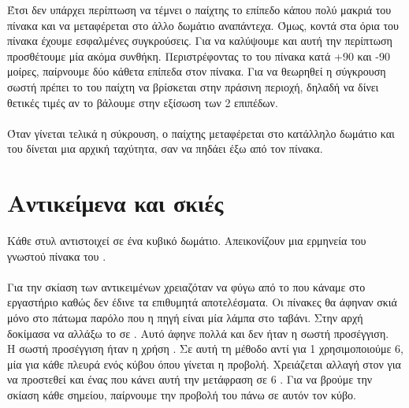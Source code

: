 \documentclass[11pt]{scrartcl} %
\begin{document}
Έτσι δεν υπάρχει περίπτωση να τέμνει ο παίχτης το επίπεδο κάπου πολύ μακριά του πίνακα και να μεταφέρεται στο άλλο δωμάτιο αναπάντεχα.
Όμως, κοντά στα όρια του πίνακα έχουμε εσφαλμένες συγκρούσεις. Για να καλύψουμε και αυτή την περίπτωση προσθέτουμε μία ακόμα συνθήκη.
Περιστρέφοντας το  του πίνακα κατά +90 και -90 μοίρες, παίρνουμε δύο κάθετα επίπεδα στον πίνακα. Για να θεωρηθεί η σύγκρουση
σωστή πρέπει το  του παίχτη να βρίσκεται στην πράσινη περιοχή, δηλαδή να δίνει θετικές τιμές αν το βάλουμε στην εξίσωση
των 2 επιπέδων.
\\\\
Όταν γίνεται τελικά η σύκρουση, ο παίχτης μεταφέρεται στο κατάλληλο δωμάτιο και του δίνεται μια αρχική ταχύτητα,
σαν να πηδάει έξω από τον πίνακα.
\clearpage

\section{Αντικείμενα και σκιές}
Κάθε στυλ  αντιστοιχεί σε ένα κυβικό δωμάτιο. Απεικονίζουν μια  ερμηνεία του γνωστού πίνακα του
.
\\\\
Για την σκίαση των αντικειμένων χρειαζόταν να φύγω από το  που κάναμε στο εργαστήριο καθώς δεν έδινε
τα επιθυμητά αποτελέσματα. Οι πίνακες θα άφηναν σκιά μόνο στο πάτωμα παρόλο που η πηγή είναι μία λάμπα στο ταβάνι. Στην αρχή
δοκίμασα να αλλάξω το  σε . Αυτό άφηνε πολλά  και δεν ήταν η σωστή
προσέγγιση.
\\
Η σωστή προσέγγιση ήταν η χρήση  \cite{PointShadows}. Σε αυτή τη μέθοδο αντί για 1  χρησιμοποιούμε 6, μία για κάθε
πλευρά ενός κύβου όπου γίνεται η προβολή. Χρειάζεται αλλαγή στον  για να προστεθεί και ένας  που κάνει αυτή την
μετάφραση σε 6 . Για να βρούμε την σκίαση κάθε σημείου, παίρνουμε την προβολή του πάνω σε αυτόν τον κύβο.
\end{document}
